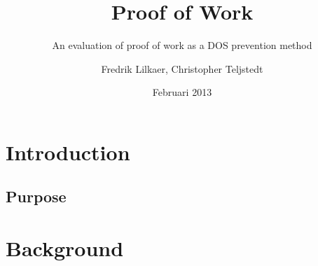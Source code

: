 \documentclass[a4paper,11pt]{kth-mag}
\title{Proof of Work}
\subtitle{An evaluation of proof of work as a DOS prevention method}
\author{Fredrik Lilkaer, Christopher Teljstedt}
\date{Februari 2013}
\begin{document}
\removepagenumbers
\maketitle
{}
\chapter{Introduction}

\section{Purpose}

\chapter{Background}



\begin{comment}
\begin{figure}[ht]
\begin{center}
And here is a figure
\caption{\small{Several statements describing the same resource.}}\label{RDF_4}
\end{center}
\end{figure}


that we refer to here: \ref{RDF_4}
\end{comment}
\printbibliography
\end{document}
